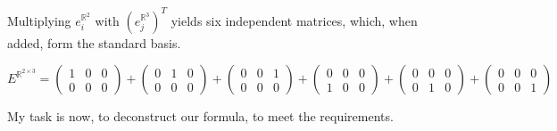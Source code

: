 \documentclass[a4paper]{article}
\begin{document}
Multiplying $e_{i}^{\mathbb{R}^{2}}$ with $(e_{j}^{\mathbb{R}^{3}})^{T}$ yields six independent matrices, which, when added, form the standard basis.

\begin{displaymath}
E^{\mathbb{R}^{2\times{3}}} =
\begin{pmatrix}1&0&0\\0&0&0\end{pmatrix}+
\begin{pmatrix}0&1&0\\0&0&0\end{pmatrix}+
\begin{pmatrix}0&0&1\\0&0&0\end{pmatrix}+
\begin{pmatrix}0&0&0\\1&0&0\end{pmatrix}+
\begin{pmatrix}0&0&0\\0&1&0\end{pmatrix}+
\begin{pmatrix}0&0&0\\0&0&1\end{pmatrix}

\end{displaymath}

My task is now, to deconstruct our formula, to meet the requirements. 
\end{document}
